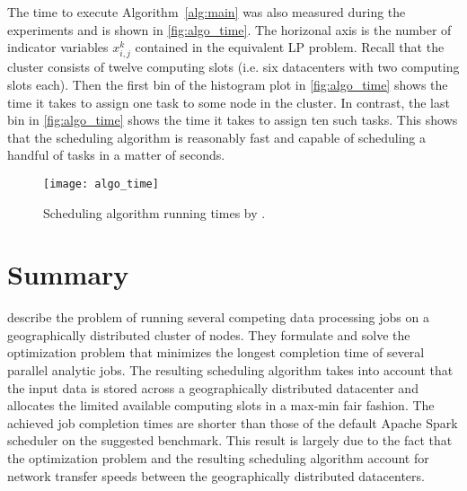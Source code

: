 The time to execute Algorithm~\ref{alg:main} was also measured during the experiments and is shown in \autoref{fig:algo_time}. The horizonal axis is the number of indicator variables \(x^k_{i, j}\) contained in the equivalent LP problem. Recall that the cluster consists of twelve computing slots (i.e. six datacenters with two computing slots each). Then the first bin of the histogram plot in \autoref{fig:algo_time} shows the time it takes to assign one task to some node in the cluster. In contrast, the last bin in \autoref{fig:algo_time} shows the time it takes to assign ten such tasks. This shows that the scheduling algorithm is reasonably fast and capable of scheduling a handful of tasks in a matter of seconds.

\begin{figure}
  \centering
  \texttt{[image: algo\_time]} \\
  \caption{Scheduling algorithm running times by \citet{Chen2017}.}
  \label{fig:algo_time}
\end{figure}

\section{Summary}

\citet{Chen2017} describe the problem of running several competing data processing jobs on a geographically distributed cluster of nodes. They formulate and solve the optimization problem that minimizes the longest completion time of several parallel analytic jobs. The resulting scheduling algorithm takes into account that the input data is stored across a geographically distributed datacenter and allocates the limited available computing slots in a max-min fair fashion. The achieved job completion times are shorter than those of the default Apache Spark scheduler on the suggested benchmark. This result is largely due to the fact that the optimization problem and the resulting scheduling algorithm account for network transfer speeds between the geographically distributed datacenters.
